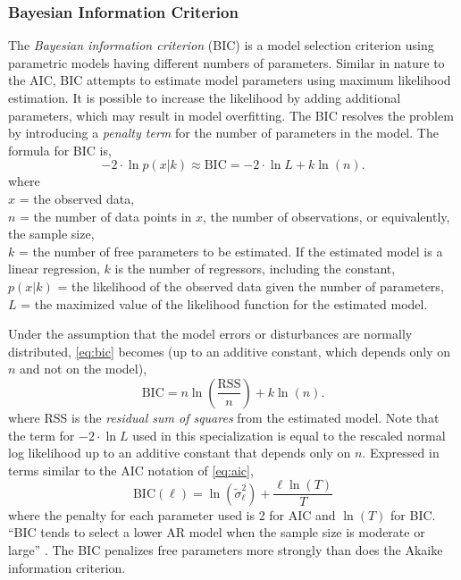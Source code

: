 \subsubsection{Bayesian Information Criterion}\label{Bayesian information criterion (BIC)}
The \emph{Bayesian information criterion} (BIC) is a model selection criterion using parametric models having different numbers of parameters.
Similar in nature to the AIC, BIC attempts to estimate model parameters using maximum likelihood estimation. It is possible to increase the likelihood by adding additional parameters, which may result in model overfitting. The BIC resolves the problem by introducing a \emph{penalty term} for the number of parameters in the model. The formula for BIC is,
\begin{equation}
	{-2 \cdot \ln{p(x|k)}} \approx \mathrm{BIC} = {-2 \cdot \ln{L} + k \ln(n) }.
\label{eq:bic}
\end{equation}
where \\
$x$ = the observed data, \\
$n$ = the number of data points in $x$, the number of observations, or equivalently, the sample size, \\
$k$ = the number of free parameters to be estimated. If the estimated model is a linear regression, $k$ is the number of regressors, including the constant, \\
$p(x|k)$ = the likelihood of the observed data given the number of parameters,\\
$L$ = the maximized value of the likelihood function for the estimated model.
\bigskip

Under the assumption that the model errors or disturbances are normally distributed, \eqref{eq:bic} becomes (up to an additive constant, which depends only on $n$ and not on the model),
\[
\mathrm{BIC} = n \ln\left(\frac{\mathrm{RSS}}{n}\right) + k \ln(n).
\]
where RSS is the \emph{residual sum of squares} from the estimated model. Note that the term for $-2 \cdot \ln{L}$ used in this specialization is equal to the rescaled normal log likelihood up to an additive constant that depends only on $n$. Expressed in terms similar to the AIC notation of \eqref{eq:aic},
\[
\mathrm{BIC}(\ell)=\ln(\tilde{\sigma}_{\ell}^2) + \frac{\ell \ln(T)}{T}
\]
where the penalty for each parameter used is 2 for AIC and $\ln(T)$ for BIC. ``BIC tends to select a lower AR model when the sample size is moderate or large'' \cite[p. 42]{tsay2005aft}. The BIC penalizes free parameters more strongly than does the Akaike information criterion.

